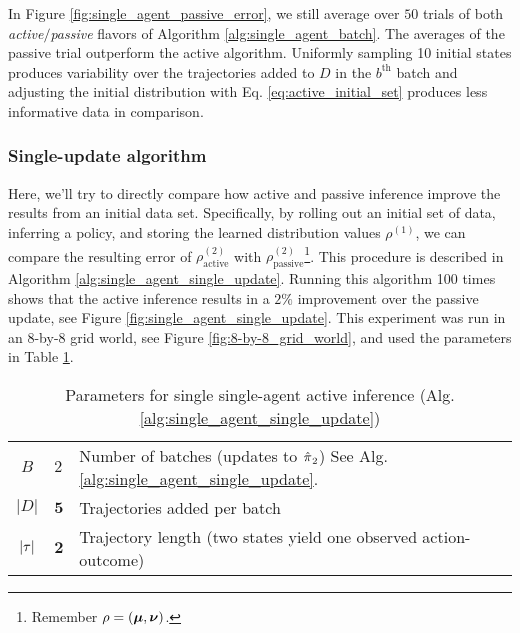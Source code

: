 \begin{figure}[htb]
    \begin{center}
    \end{center}
\end{figure}

In Figure \ref{fig:single_agent_passive_error}, we still average over $50$ trials of both \emph{active}$/$\emph{passive}
flavors of Algorithm \ref{alg:single_agent_batch}. The averages of the passive trial outperform the active algorithm.
Uniformly sampling 10 initial states produces variability over the trajectories added to $D$ in the $b^\text{th}$ batch
and adjusting the initial distribution with Eq. \ref{eq:active_initial_set} produces less informative data in
comparison.

\subsubsection{Single-update algorithm}

Here, we'll try to directly compare how active and passive inference improve the results from an initial data set.
Specifically, by rolling out an initial set of data, inferring a policy, and storing the learned distribution values
$\rho^{(1)}$, we can compare the resulting error of $\rho^{(2)}_{\text{active}}$ with
$\rho^{(2)}_{\text{passive}}$\footnote{Remember $\rho = (\boldsymbol{\mathbb{\mu}}, \boldsymbol{\mathbb{\nu}})$.}. This procedure is described in
Algorithm \ref{alg:single_agent_single_update}. Running this algorithm 100 times shows that the active inference results
in a $2\%$ improvement over the passive update, see Figure \ref{fig:single_agent_single_update}. This experiment was run
in an 8-by-8 grid world, see Figure \ref{fig:8-by-8_grid_world}, and used the parameters in Table
\ref{table:single_agent_active_alg_two_stage}.

\begin{table}[htb]
    \centering
    \begin{tabular}{c|l l}
        $B$ & $2$ & Number of batches (updates to $\hat{\pi_{}}_2$) See Alg.
                    \ref{alg:single_agent_single_update}.\\
        $|D|$ & $\mathbf{5}$ & Trajectories added per batch \\
        $|\tau|$ & $\mathbf{2}$ & Trajectory length (two states yield one observed action-outcome) \\
    \end{tabular}
    \caption{Parameters for single single-agent active inference (Alg. \ref{alg:single_agent_single_update})}
    \label{table:single_agent_active_alg_two_stage}
\end{table}

